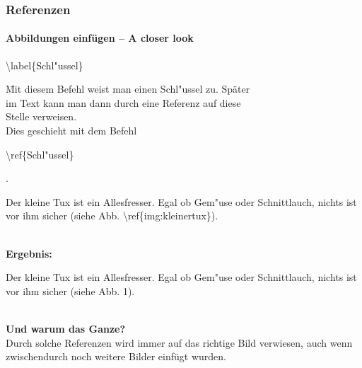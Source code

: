 
\begin{frame}
\frametitle{Referenzen}
\framesubtitle{Abbildungen einfügen – A closer look}
\begin{tabbing}
\begin{ttfamily}\color{nounibaredI}\textbackslash label\color{black}\{Schl"ussel\}\end{ttfamily} \= Mit diesem Befehl weist man einen Schl"ussel zu. Später\\
\> im Text kann man dann durch eine Referenz auf diese\\
\> Stelle verweisen.\\
\> Dies geschieht mit dem Befehl
\begin{ttfamily}\color{nounibaredI}\textbackslash ref\color{black}\{Schl"ussel\}\end{ttfamily}.
\end{tabbing}
\begin{ttfamily}Der kleine Tux ist ein Allesfresser. Egal ob Gem"use oder
Schnittlauch, nichts ist vor ihm sicher (siehe Abb.
\color{nounibaredI}\textbackslash ref\color{black}\{img:kleinertux\}).\end{ttfamily}\\[3mm]
\textbf{Ergebnis:}\\[3mm]
\begin{minipage}{\textwidth}\begin{rm}
Der kleine Tux ist ein Allesfresser. Egal ob Gem"use oder
Schnittlauch, nichts ist vor ihm sicher (siehe Abb.
1).\end{rm} \end{minipage}\\[3mm]
\textbf{Und warum das Ganze?}\\
Durch solche Referenzen wird immer auf das richtige Bild verwiesen, auch wenn zwischendurch noch weitere Bilder einfügt wurden.
\end{frame}


